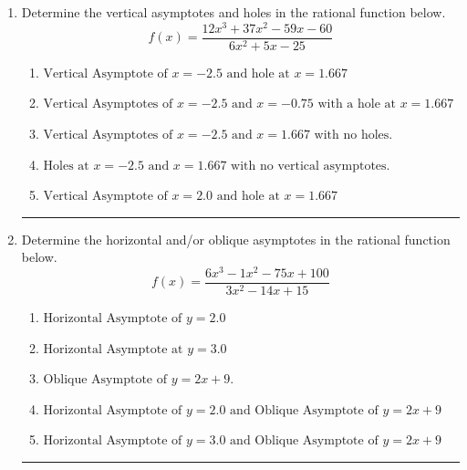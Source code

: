 \documentclass[14pt]{extbook}
\newcommand{\litem}[1]{\item#1\hspace*{-1cm}\rule{\textwidth}{0.4pt}}
\begin{document}
\begin{enumerate}
{\begin{enumerate}[label=\Alph*.]
\end{enumerate} }
\litem{
Determine the vertical asymptotes and holes in the rational function below.\[ f(x) = \frac{12x^{3} +37 x^{2} -59 x -60}{6x^{2} +5 x -25} \]\begin{enumerate}[label=\Alph*.]
\item \( \text{Vertical Asymptote of } x = -2.5 \text{ and hole at } x = 1.667 \)
\item \( \text{Vertical Asymptotes of } x = -2.5 \text{ and } x = -0.75 \text{ with a hole at } x = 1.667 \)
\item \( \text{Vertical Asymptotes of } x = -2.5 \text{ and } x = 1.667 \text{ with no holes.} \)
\item \( \text{Holes at } x = -2.5 \text{ and } x = 1.667 \text{ with no vertical asymptotes.} \)
\item \( \text{Vertical Asymptote of } x = 2.0 \text{ and hole at } x = 1.667 \)

\end{enumerate} }
\litem{
Determine the horizontal and/or oblique asymptotes in the rational function below.\[ f(x) = \frac{6x^{3} -1 x^{2} -75 x + 100}{3x^{2} -14 x + 15} \]\begin{enumerate}[label=\Alph*.]
\item \( \text{Horizontal Asymptote of } y = 2.0  \)
\item \( \text{Horizontal Asymptote at } y = 3.0 \)
\item \( \text{Oblique Asymptote of } y = 2x + 9. \)
\item \( \text{Horizontal Asymptote of } y = 2.0 \text{ and Oblique Asymptote of } y = 2x + 9 \)
\item \( \text{Horizontal Asymptote of } y = 3.0 \text{ and Oblique Asymptote of } y = 2x + 9 \)


\end{enumerate}}
\end{enumerate}
\end{document}
